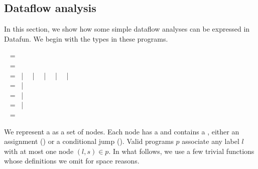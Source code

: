 

\subsection{Dataflow analysis}
\label{dataflow-analysis}


In this section, we show how some simple dataflow analyses can be
expressed in Datafun. We begin with the types in these programs.

\begin{code}
  ~ = \tstring\\
  ~ = \tint\\
  ~ =  ~|~ 
  ~|~  ~|~  ~|~  ~|~ \\
  ~ =  \< ~|~  \<\tint\\
  ~ =
     \< ~|~
     \< \< \<\\
  ~ =
     \< \<
    ~|~  \< \< \<
  \\
  ~ = 
\end{code}

\noindent
We represent a  as a set of nodes. Each node has a
 and contains a , either an assignment
() or a conditional jump (). Valid programs $p$ associate
any label $l$ with at most one node $(l,s) \in p$. In what follows, we use a few
trivial functions whose definitions we omit for space reasons. 

\begin{code}
   \isa {} \to {}\\
   \isa \iso{} \to {}\\
   \isa \iso{} \to {}
\end{code}

